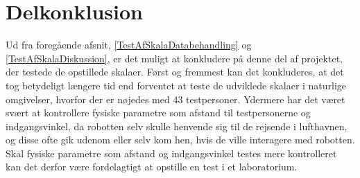 \chapter{Delkonklusion}
\label{TestAfSkalaDelKonklusion}
%
Ud fra foregående afsnit, \autoref{TestAfSkalaDatabehandling} og \autoref{TestAfSkalaDiskussion}, er det muligt at konkludere på denne del af projektet, der testede de opstillede skalaer.\blankline
%
Først og fremmest kan det konkluderes, at det tog betydeligt længere tid end forventet at teste de udviklede skalaer i naturlige omgivelser, hvorfor der er nøjedes med 43 testpersoner. Ydermere har det været svært at kontrollere fysiske parametre som afstand til testpersonerne og indgangsvinkel, da robotten selv skulle henvende sig til de rejsende i lufthavnen, og disse ofte gik udenom eller selv kom hen, hvis de ville interagere med robotten. Skal fysiske parametre som afstand og indgangsvinkel testes mere kontrolleret kan det derfor være fordelagtigt at opstille en test i et laboratorium.

